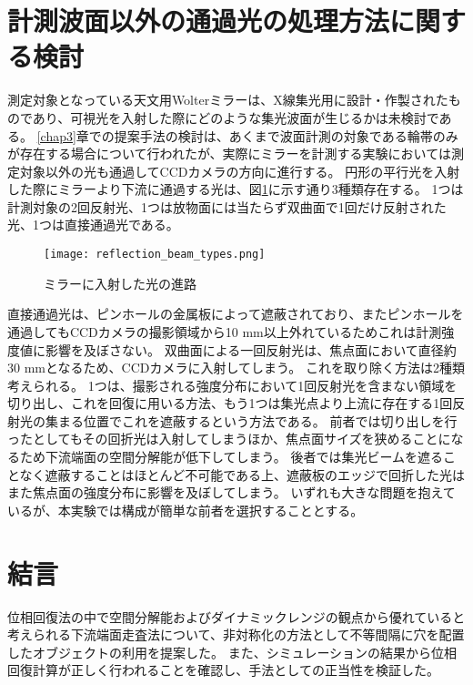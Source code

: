\section{計測波面以外の通過光の処理方法に関する検討}
\label{chap3_first_reflection_shutter}

測定対象となっている天文用Wolterミラーは、X線集光用に設計・作製されたものであり、可視光を入射した際にどのような集光波面が生じるかは未検討である。
\ref{chap3}章での提案手法の検討は、あくまで波面計測の対象である輪帯のみが存在する場合について行われたが、実際にミラーを計測する実験においては測定対象以外の光も通過してCCDカメラの方向に進行する。
円形の平行光を入射した際にミラーより下流に通過する光は、図\ref{fig:mirror_beam_path_types}に示す通り3種類存在する。
1つは計測対象の2回反射光、1つは放物面には当たらず双曲面で1回だけ反射された光、1つは直接通過光である。

\begin{figure}[!ht]
\centering
\texttt{[image: reflection\_beam\_types.png]}
\caption{ミラーに入射した光の進路}
\label{fig:mirror_beam_path_types}
\end{figure}

直接通過光は、ピンホールの金属板によって遮蔽されており、またピンホールを通過してもCCDカメラの撮影領域から10 mm以上外れているためこれは計測強度値に影響を及ぼさない。
双曲面による一回反射光は、焦点面において直径約30 mmとなるため、CCDカメラに入射してしまう。
これを取り除く方法は2種類考えられる。
1つは、撮影される強度分布において1回反射光を含まない領域を切り出し、これを回復に用いる方法、もう1つは集光点より上流に存在する1回反射光の集まる位置でこれを遮蔽するという方法である。
前者では切り出しを行ったとしてもその回折光は入射してしまうほか、焦点面サイズを狭めることになるため下流端面の空間分解能が低下してしまう。
後者では集光ビームを遮ることなく遮蔽することはほとんど不可能である上、遮蔽板のエッジで回折した光はまた焦点面の強度分布に影響を及ぼしてしまう。
いずれも大きな問題を抱えているが、本実験では構成が簡単な前者を選択することとする。



\clearpage
\newpage


\section{結言}
\label{chap3_conclusion}

位相回復法の中で空間分解能およびダイナミックレンジの観点から優れていると考えられる下流端面走査法について、非対称化の方法として不等間隔に穴を配置したオブジェクトの利用を提案した。
また、シミュレーションの結果から位相回復計算が正しく行われることを確認し、手法としての正当性を検証した。


